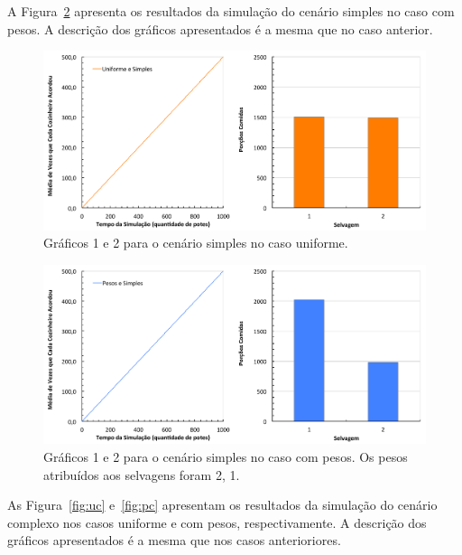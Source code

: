 \documentclass[11pt,a4paper]{article}
\begin{document}
A Figura~\ref{fig:ps} apresenta os resultados da simulação do cenário simples no caso com pesos. A 
descrição dos gráficos apresentados é a mesma que no caso anterior.

\begin{figure}[!ht]
  \begin{center} 
    \includegraphics[scale=0.5]{uniforme_simples.pdf}
    \caption{Gráficos 1 e 2 para o cenário simples no caso uniforme.}
    \label{fig:us}
  \end{center}
\end{figure}
%
\begin{figure}[!ht]
  \begin{center}
    \includegraphics[scale=0.5]{pesos_simples.pdf}
    \caption{Gráficos 1 e 2 para o cenário simples no caso com pesos. Os pesos atribuídos aos 
    selvagens foram 2, 1.}
    \label{fig:ps}
  \end{center}
\end{figure}

As Figura~\ref{fig:uc} e~\ref{fig:pc} apresentam os resultados da simulação do cenário complexo nos 
casos uniforme e com pesos, respectivamente. A descrição dos gráficos apresentados é a mesma que nos 
casos anterioriores.
\end{document}
